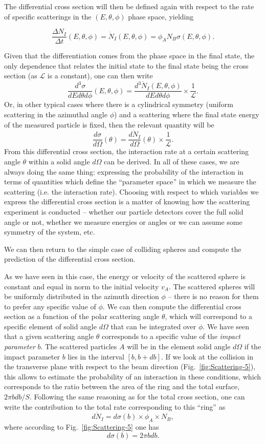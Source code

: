 The differential cross section will then be defined again with respect to the rate of specific scatterings in the $(E,\theta, \phi)$ phase space, yielding

\[
\frac{\Delta N_I}{\Delta t} (E,\theta, \phi) = \dot{N}_I (E,\theta, \phi) = \phi_A N_B \sigma (E,\theta, \phi).
\]

Given that the differentiation comes from the phase space in the final state, the only dependence that relates the initial state to the final state being the cross section (as $\mathcal{L}$ is a constant), one can then write
\[\frac{d^3\sigma}{dE d\theta d\phi}(E,\theta,\phi) = \frac{d^3 \dot{N}_I 
(E,\theta,\phi)}{dE d\theta d\phi} \times \frac{1}{\mathcal{L}}.\]
Or, in other typical cases where there is a cylindrical symmetry (uniform scattering in the azimuthal angle $\phi$) and a scattering where the final state energy of the measured particle is fixed, then the relevant quantity will be
\[\frac{d\sigma}{d\Omega}(\theta) = \frac{d \dot{N}_I}{
d\Omega}(\theta) \times \frac{1}{\mathcal{L}}.\]
From this differential cross section, the interaction rate at a certain scattering angle $\theta$ within a solid angle $d\Omega$ can be derived. In all of these cases, we are always doing the same thing: expressing the probability of the interaction in terms of quantities which define the ``parameter space'' in which we measure the scattering (i.e. the interaction rate). Choosing with respect to which variables we express the differential cross section is a matter of knowing how the scattering experiment is conducted -- whether our particle detectors cover the full solid angle or not, whether we measure energies or angles or we can assume some symmetry of the system, etc.

We can then return to the simple case of colliding spheres and compute the prediction of the differential cross section.

As we have seen in this case, the energy or velocity of the scattered sphere is constant and equal in norm to the initial velocity $v_A$. The scattered spheres will be uniformly distributed in the azimuth direction $\phi$ -- there is no reason for them to prefer any specific value of $\phi$. We can then compute the differential cross section as a function of the polar scattering angle $\theta$, which will correspond to a specific element of solid angle $d\Omega$ that can be integrated over $\phi$. We have seen that  a given scattering angle $\theta$ corresponds to a specific value of the {\it impact parameter} $b$. The scattered particles $A$ will be in the element solid angle $d\Omega$ if the impact parameter $b$ lies in the interval $[b, b+db]$. If we look at the collision in the transverse plane with respect to the beam direction (Fig.~\ref{fig:Scattering-5}), this allows to estimate the probability of an interaction in these conditions, which corresponds to the ratio between the area of the ring and the total surface, $2\pi b db/S$. Following the same reasoning as for the total cross section, one can write the contribution to the total rate corresponding to this ``ring'' as
\[
d \dot{N}_I = d \sigma (b) \times \phi_A \times N_B,
\]
where according to Fig.~\ref{fig:Scattering-5} one has
\[d\sigma (b) = 2 \pi b db.\]

